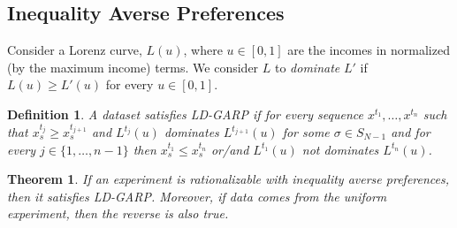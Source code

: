 \documentclass[12pt,dvipsnames]{amsart}
\newtheorem{thm}{Theorem}
\newtheorem{defn}{Definition}
\begin{document}
\subsection{Inequality Averse Preferences}

Consider a Lorenz curve, $L(u)$, where $u\in[0,1]$ are the incomes in normalized (by the maximum income) terms. We consider $L$ to \emph{dominate} $L'$ if $L(u)\geq L'(u)$ for every $u\in[0,1]$.

\begin{defn}
\label{def:LDGARP}
A dataset satisfies LD-GARP if for every sequence $x^{t_1},\ldots,x^{t_n}$ such that $x^{t_j}_s\geq x^{t_{j+1}}_s$ and $L^{t_j}(u)$ dominates $L^{t_{j+1}}(u)$ for some $\sigma\in S_{N-1}$ and for every $j\in \{1,\ldots,n-1\}$ then $x^{t_1}_s\leq x^{t_{n}}_s$ or/and $L^{t_1}(u)$ not dominates $L^{t_{n}}(u)$.
\end{defn}

\begin{thm}
\label{thm:IA}
If an experiment is rationalizable with inequality averse preferences, then it satisfies LD-GARP.
Moreover, if data comes from the uniform experiment, then the reverse is also true.
\end{thm}





\end{document}

